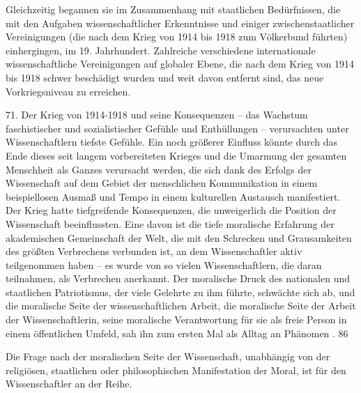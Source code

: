 \documentclass[11pt,a4paper]{book}
\begin{document}
Gleichzeitig begannen sie im Zusammenhang mit staatlichen Bedürfnissen, die mit den Aufgaben wissenschaftlicher Erkenntnisse und einiger zwischenstaatlicher Vereinigungen (die nach dem Krieg von 1914 bis 1918 zum Völkerbund führten) einhergingen, im 19. Jahrhundert. Zahlreiche verschiedene internationale wissenschaftliche Vereinigungen auf globaler Ebene, die nach dem Krieg von 1914 bis 1918 schwer beschädigt wurden und weit davon entfernt sind, das neue Vorkriegsniveau zu erreichen.



71. Der Krieg von 1914-1918 und seine Konsequenzen -- das Wachstum faschistischer und sozialistischer Gefühle und Enthüllungen -- verursachten unter Wissenschaftlern tiefste Gefühle. Ein noch größerer Einfluss könnte durch das Ende dieses seit langem vorbereiteten Krieges und die Umarmung der gesamten Menschheit als Ganzes verursacht werden, die sich dank des Erfolgs der Wissenschaft auf dem Gebiet der menschlichen Kommunikation in einem beispiellosen Ausmaß und Tempo in einem kulturellen Austausch manifestiert. Der Krieg hatte tiefgreifende Konsequenzen, die unweigerlich die Position der Wissenschaft beeinflussten. Eine davon ist die tiefe moralische Erfahrung der akademischen Gemeinschaft der Welt, die mit den Schrecken und Grausamkeiten des größten Verbrechens verbunden ist, an dem Wissenschaftler aktiv teilgenommen haben -- es wurde von so vielen Wissenschaftlern, die daran teilnahmen, als Verbrechen anerkannt. Der moralische Druck des nationalen und staatlichen Patriotismus, der viele Gelehrte zu ihm führte, schwächte sich ab, und die moralische Seite der wissenschaftlichen Arbeit, die moralische Seite der Arbeit der Wissenschaftlerin, seine moralische Verantwortung für sie als freie Person in einem öffentlichen Umfeld, sah ihn zum ersten Mal als Alltag an Phänomen . 86



Die Frage nach der moralischen Seite der Wissenschaft, unabhängig von der religiösen, staatlichen oder philosophischen Manifestation der Moral, ist für den Wissenschaftler an der Reihe.
\end{document}
